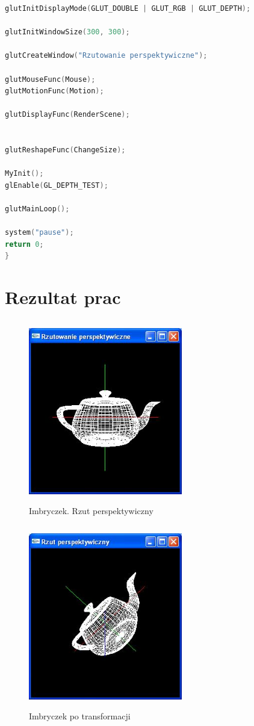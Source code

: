 \documentclass[a4paper,11pt]{article}
\begin{document}
{\begin{lstlisting}[language=C++]
glutInitDisplayMode(GLUT_DOUBLE | GLUT_RGB | GLUT_DEPTH);

glutInitWindowSize(300, 300);

glutCreateWindow("Rzutowanie perspektywiczne");

glutMouseFunc(Mouse);
glutMotionFunc(Motion);

glutDisplayFunc(RenderScene);


glutReshapeFunc(ChangeSize);

MyInit();
glEnable(GL_DEPTH_TEST);

glutMainLoop();

system("pause");
return 0;
}
\end{lstlisting}
}



  \section{Rezultat prac}

    \begin{figure}[h!]
      \centering
      \includegraphics[width=0.6\textwidth,height=8cm]{rzutperspektywiczny.jpg}
      \caption{Imbryczek. Rzut perspektywiczny}
      \label{fig:zrzut1}
    \end{figure}

    \begin{figure}[h!]
      \centering
      \includegraphics[width=0.6\textwidth,height=8cm]{rzutperspektywiczny1.jpg}
      \caption{Imbryczek po transformacji}
      \label{fig:zrzut1}
    \end{figure}
\end{document}

